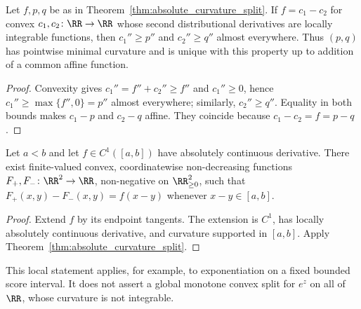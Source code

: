 \begin{proposition}\label{prop:curvature_minimality}
Let $f,p,q$ be as in Theorem~\ref{thm:absolute_curvature_split}. If $f=c_1-c_2$ for convex $c_1,c_2\colon\RR\to\RR$ whose second distributional derivatives are locally integrable functions, then $c_1''\ge p''$ and $c_2''\ge q''$ almost everywhere. Thus $(p,q)$ has pointwise minimal curvature and is unique with this property up to addition of a common affine function.
\end{proposition}

\begin{proof}
Convexity gives $c_1''=f''+c_2''\ge f''$ and $c_1''\ge0$, hence $c_1''\ge\max\{f'',0\}=p''$ almost everywhere; similarly, $c_2''\ge q''$. Equality in both bounds makes $c_1-p$ and $c_2-q$ affine. They coincide because $c_1-c_2=f=p-q$.
\end{proof}

\begin{corollary}\label{cor:local_curvature_split}
Let $a<b$ and let $f\in C^1([a,b])$ have absolutely continuous derivative. There exist finite-valued convex, coordinatewise non-decreasing functions $F_+,F_-\colon\RR^2\to\RR$, non-negative on $\RR^2_{\ge0}$, such that $F_+(x,y)-F_-(x,y)=f(x-y)$ whenever $x-y\in[a,b]$.
\end{corollary}

\begin{proof}
Extend $f$ by its endpoint tangents. The extension is $C^1$, has locally absolutely continuous derivative, and curvature supported in $[a,b]$. Apply Theorem~\ref{thm:absolute_curvature_split}.
\end{proof}

This local statement applies, for example, to exponentiation on a fixed bounded score interval. It does not assert a global monotone convex split for $e^z$ on all of $\RR$, whose curvature is not integrable.

